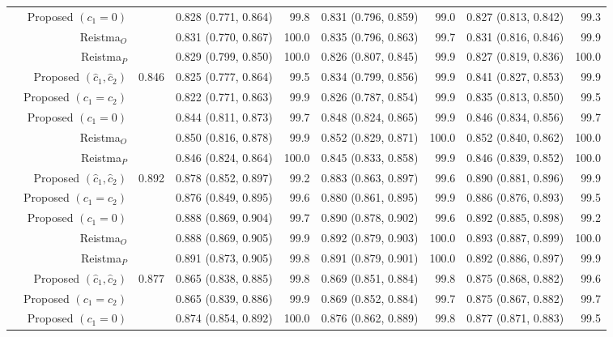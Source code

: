 \begin{table}
\begin{threeparttable}
\begin{tabular}[t]{rrrrrrrrr}
 & Proposed $(c_1 = 0)$ &  & 0.828 (0.771, 0.864) & 99.8 & 0.831 (0.796, 0.859) & 99.0 & 0.827 (0.813, 0.842) & 99.3\\
 & Reistma$_O$ &  & 0.831 (0.770, 0.867) & 100.0 & 0.835 (0.796, 0.863) & 99.7 & 0.831 (0.816, 0.846) & 99.9\\
 & Reistma$_P$ &  & 0.829 (0.799, 0.850) & 100.0 & 0.826 (0.807, 0.845) & 99.9 & 0.827 (0.819, 0.836) & 100.0\\
\addlinespace
4 & Proposed $(\hat{c}_1, \hat{c}_2)$ & 0.846 & 0.825 (0.777, 0.864) & 99.5 & 0.834 (0.799, 0.856) & 99.9 & 0.841 (0.827, 0.853) & 99.9\\
 & Proposed $(c_1 = c_2)$ &  & 0.822 (0.771, 0.863) & 99.9 & 0.826 (0.787, 0.854) & 99.9 & 0.835 (0.813, 0.850) & 99.5\\
 & Proposed $(c_1 = 0)$ &  & 0.844 (0.811, 0.873) & 99.7 & 0.848 (0.824, 0.865) & 99.9 & 0.846 (0.834, 0.856) & 99.7\\
 & Reistma$_O$ &  & 0.850 (0.816, 0.878) & 99.9 & 0.852 (0.829, 0.871) & 100.0 & 0.852 (0.840, 0.862) & 100.0\\
 & Reistma$_P$ &  & 0.846 (0.824, 0.864) & 100.0 & 0.845 (0.833, 0.858) & 99.9 & 0.846 (0.839, 0.852) & 100.0\\
\addlinespace
5 & Proposed $(\hat{c}_1, \hat{c}_2)$ & 0.892 & 0.878 (0.852, 0.897) & 99.2 & 0.883 (0.863, 0.897) & 99.6 & 0.890 (0.881, 0.896) & 99.9\\
 & Proposed $(c_1 = c_2)$ &  & 0.876 (0.849, 0.895) & 99.6 & 0.880 (0.861, 0.895) & 99.9 & 0.886 (0.876, 0.893) & 99.5\\
 & Proposed $(c_1 = 0)$ &  & 0.888 (0.869, 0.904) & 99.7 & 0.890 (0.878, 0.902) & 99.6 & 0.892 (0.885, 0.898) & 99.2\\
 & Reistma$_O$ &  & 0.888 (0.869, 0.905) & 99.9 & 0.892 (0.879, 0.903) & 100.0 & 0.893 (0.887, 0.899) & 100.0\\
 & Reistma$_P$ &  & 0.891 (0.873, 0.905) & 99.8 & 0.891 (0.879, 0.901) & 100.0 & 0.892 (0.886, 0.897) & 99.9\\
\addlinespace
6 & Proposed $(\hat{c}_1, \hat{c}_2)$ & 0.877 & 0.865 (0.838, 0.885) & 99.8 & 0.869 (0.851, 0.884) & 99.8 & 0.875 (0.868, 0.882) & 99.6\\
 & Proposed $(c_1 = c_2)$ &  & 0.865 (0.839, 0.886) & 99.9 & 0.869 (0.852, 0.884) & 99.7 & 0.875 (0.867, 0.882) & 99.7\\
 & Proposed $(c_1 = 0)$ &  & 0.874 (0.854, 0.892) & 100.0 & 0.876 (0.862, 0.889) & 99.8 & 0.877 (0.871, 0.883) & 99.5\\

\end{tabular}
\end{threeparttable}
\end{table}
